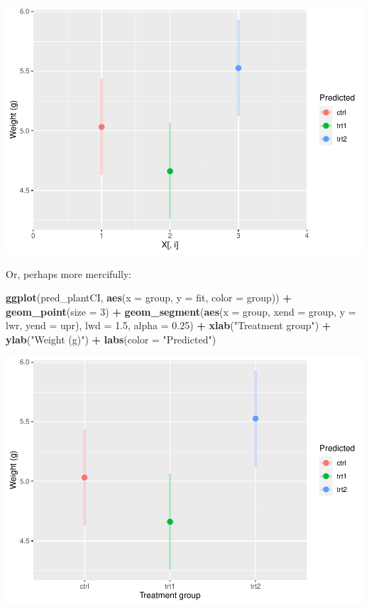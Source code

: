 \documentclass[
]{book}
\newenvironment{Shaded}{\begin{snugshade}}{\end{snugshade}}
\newcommand{\DataTypeTok}[1]{\textcolor[rgb]{0.13,0.29,0.53}{#1}}
\newcommand{\DecValTok}[1]{\textcolor[rgb]{0.00,0.00,0.81}{#1}}
\newcommand{\FloatTok}[1]{\textcolor[rgb]{0.00,0.00,0.81}{#1}}
\newcommand{\KeywordTok}[1]{\textcolor[rgb]{0.13,0.29,0.53}{\textbf{#1}}}
\newcommand{\NormalTok}[1]{#1}
\newcommand{\OperatorTok}[1]{\textcolor[rgb]{0.81,0.36,0.00}{\textbf{#1}}}
\newcommand{\StringTok}[1]{\textcolor[rgb]{0.31,0.60,0.02}{#1}}
\begin{document}
\includegraphics{worstr_files/figure-latex/unnamed-chunk-260-1.pdf}

Or, perhaps more mercifully:

\begin{Shaded}
\begin{Highlighting}[]
\KeywordTok{ggplot}\NormalTok{(pred_plantCI, }\KeywordTok{aes}\NormalTok{(}\DataTypeTok{x =}\NormalTok{ group, }\DataTypeTok{y =}\NormalTok{ fit, }\DataTypeTok{color =}\NormalTok{ group)) }\OperatorTok{+}
\StringTok{  }\KeywordTok{geom_point}\NormalTok{(}\DataTypeTok{size =} \DecValTok{3}\NormalTok{) }\OperatorTok{+}\StringTok{ }
\StringTok{  }\KeywordTok{geom_segment}\NormalTok{(}\KeywordTok{aes}\NormalTok{(}\DataTypeTok{x =}\NormalTok{ group, }\DataTypeTok{xend =}\NormalTok{ group, }\DataTypeTok{y =}\NormalTok{ lwr, }\DataTypeTok{yend =}\NormalTok{ upr),}
               \DataTypeTok{lwd =} \FloatTok{1.5}\NormalTok{, }\DataTypeTok{alpha =} \FloatTok{0.25}\NormalTok{) }\OperatorTok{+}
\StringTok{  }\KeywordTok{xlab}\NormalTok{(}\StringTok{"Treatment group"}\NormalTok{) }\OperatorTok{+}
\StringTok{  }\KeywordTok{ylab}\NormalTok{(}\StringTok{"Weight (g)"}\NormalTok{) }\OperatorTok{+}
\StringTok{  }\KeywordTok{labs}\NormalTok{(}\DataTypeTok{color =} \StringTok{"Predicted"}\NormalTok{)}
\end{Highlighting}
\end{Shaded}

\includegraphics{worstr_files/figure-latex/unnamed-chunk-261-1.pdf}
\end{document}
